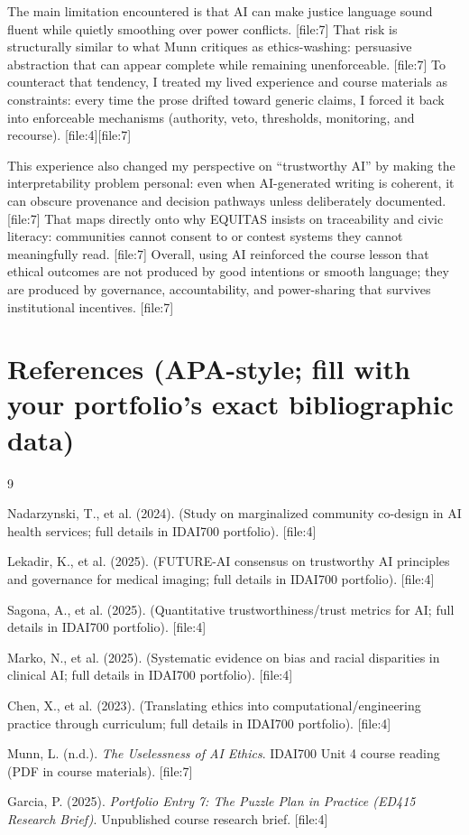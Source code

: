 \documentclass[12pt]{article}
\begin{document}
The main limitation encountered is that AI can make justice language sound fluent while quietly smoothing over power conflicts. [file:7]
That risk is structurally similar to what Munn critiques as ethics-washing: persuasive abstraction that can appear complete while remaining unenforceable. [file:7]
To counteract that tendency, I treated my lived experience and course materials as constraints: every time the prose drifted toward generic claims, I forced it back into enforceable mechanisms (authority, veto, thresholds, monitoring, and recourse). [file:4][file:7]

This experience also changed my perspective on ``trustworthy AI'' by making the interpretability problem personal: even when AI-generated writing is coherent, it can obscure provenance and decision pathways unless deliberately documented. [file:7]
That maps directly onto why EQUITAS insists on traceability and civic literacy: communities cannot consent to or contest systems they cannot meaningfully read. [file:7]
Overall, using AI reinforced the course lesson that ethical outcomes are not produced by good intentions or smooth language; they are produced by governance, accountability, and power-sharing that survives institutional incentives. [file:7]

\section*{References (APA-style; fill with your portfolio's exact bibliographic data)}
\begin{thebibliography}{9}

Nadarzynski, T., et al. (2024).
(Study on marginalized community co-design in AI health services; full details in IDAI700 portfolio). [file:4]

Lekadir, K., et al. (2025).
(FUTURE-AI consensus on trustworthy AI principles and governance for medical imaging; full details in IDAI700 portfolio). [file:4]

Sagona, A., et al. (2025).
(Quantitative trustworthiness/trust metrics for AI; full details in IDAI700 portfolio). [file:4]

Marko, N., et al. (2025).
(Systematic evidence on bias and racial disparities in clinical AI; full details in IDAI700 portfolio). [file:4]

Chen, X., et al. (2023).
(Translating ethics into computational/engineering practice through curriculum; full details in IDAI700 portfolio). [file:4]

Munn, L. (n.d.).
\textit{The Uselessness of AI Ethics}. IDAI700 Unit 4 course reading (PDF in course materials). [file:7]

Garcia, P. (2025).
\textit{Portfolio Entry 7: The Puzzle Plan in Practice (ED415 Research Brief)}. Unpublished course research brief. [file:4]

\end{thebibliography}
\end{document}
